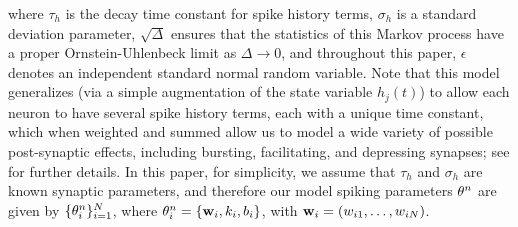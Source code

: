 where $\tau_h$ is the decay time constant for spike history terms, $\sigma_h$ is a standard deviation parameter, $\sqrt{\Delta}$ ensures that the statistics of this Markov process have a proper Ornstein-Uhlenbeck limit as $\Delta \to 0$, and throughout this paper, $\epsilon$ denotes an independent standard normal random variable. Note that this model generalizes (via a simple augmentation of the state variable $h_j(t)$) to allow each neuron to have several spike history terms, each with a unique time constant, which when weighted and summed allow us to model a wide variety of possible post-synaptic effects, including bursting, facilitating, and depressing synapses; see \cite{Vogelstein2009} for further details. In this paper, for simplicity, we assume that $\tau_h$ and $\sigma_h$ are known synaptic parameters, and therefore our model spiking parameters $\mathbf{\theta}^n$ are given by $\{\mathbf{\theta}^n_i\}_{i=1}^N$, where $\mathbf{\theta}^n_i=\{\mathbf{w}_i,k_i,b_i\}$, with $\mathbf{w}_i=(w_{i1},\ldots, w_{iN})$.

